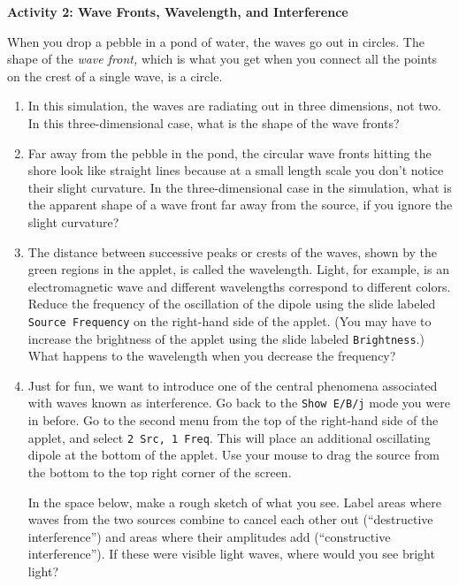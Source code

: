 \textbf{Activity 2: Wave Fronts, Wavelength, and Interference}


When you drop a pebble in a pond of water, the waves go out in circles. The shape of the \textit{wave front,} which is what you get when you connect all the points on the crest of a single wave, is a circle.   

\begin{enumerate}[labparts]

\item In this simulation, the waves are radiating out in three dimensions, not two.  In this three-dimensional case, what is the shape of the wave fronts?
\answerspace{1cm}

\item Far away from the pebble in the pond, the circular wave fronts hitting the shore look like straight lines because at a small length scale you don't notice their slight curvature. 
In the three-dimensional case in the simulation, what is the apparent shape of a wave front far away from the source, if you ignore the slight curvature?
\answerspace{1cm}


\pagebreak[2]

\item The distance between successive peaks or crests of the waves, shown by the green regions in the
applet, is called the wavelength.  
Light, for example, is an electromagnetic wave and different wavelengths correspond 
to different colors.
Reduce the frequency of the oscillation of the dipole using the slide labeled
\texttt{Source Frequency} on the right-hand side of the applet.
(You may have to increase the brightness of the applet using the slide labeled
\texttt{Brightness}.)
What happens to the wavelength when you decrease the frequency?
\answerspace{1.0cm}


\item Just for fun, we want to introduce one of the central phenomena associated
with waves known as interference.
Go back to the \texttt{Show E/B/j} mode you were in before. 
Go to the second menu from the top of the right-hand side of the applet, and select
\texttt{2 Src, 1 Freq}.
This will place an additional oscillating dipole at the bottom of the applet.  Use your mouse to drag the source from the bottom to the top right corner of the screen.

In the space below, make a rough sketch of what you see.  Label areas where waves from the two sources combine to cancel each other out (``destructive interference'') and areas where their amplitudes add (``constructive interference'').  If these were visible light waves, where would you see bright light?
\answerspace{40mm}

\end{enumerate}

